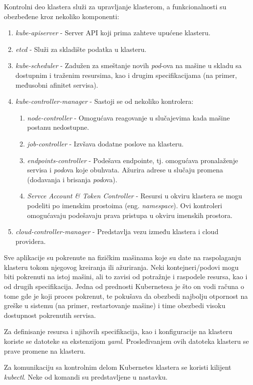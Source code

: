 \documentclass[12pt,oneside]{memoir}
\begin{document}
Kontrolni deo klastera služi za upravljanje klasterom, a funkcionalnosti su obezbeđene kroz nekoliko komponenti:
\begin{enumerate}
\item \emph{kube-apiserver} - Server API koji prima zahteve upućene klasteru.
\item \emph{etcd} - Služi za skladište podatka u klasteru.
\item \emph{kube-scheduler} - Zadužen za smeštanje novih \emph{pod}-ova na mašine u skladu sa dostupnim i traženim resursima, kao i drugim specifikacijama (na primer, međusobni afinitet servisa).
\item \emph{kube-controller-manager} - Sastoji se od nekoliko kontrolera:
	\begin{enumerate}
	\item \emph{node-controller} - Omogućava reagovanje u slučajevima kada mašine postanu nedostupne.
	\item \emph{job-controller} - Izvšava dodatne poslove na klasteru.
	\item \emph{endpoints-controller} - Podešava endpointe, tj. omogućava pronalaženje servisa i \emph{pod}ova koje obuhvata. Ažurira adrese u slučaju promena (dodavanja i brisanja \emph{pod}ova).
	\item \emph{Servce Account \& Token Controller} - Resursi u okviru klastera se mogu podeliti po imenskim prostoima (eng. \emph{namespace}). Ovi kontroleri omogućavaju podešavaju prava pristupa u okviru imenskih prostora.
	\end{enumerate}
\item \emph{cloud-controller-manager} - Predstavlja vezu između klastera i cloud providera.
\end{enumerate}
Sve aplikacije su pokrenute na fizičkim mašinama koje su date na raspolaganju klasteru tokom njegovog kreiranja ili ažuriranja. Neki kontejneri/podovi mogu biti pokrenuti na istoj mašini, ali to zavisi od potražnje i raspodele resursa, kao i od drugih specifikacija. Jedna od prednosti Kubernetesa je što on vodi računa o tome gde je koji proces pokrenut, te pokušava da obezbedi najbolju otpornost na greške u sistemu (na primer, restartovanje mašine) i time obezbedi visoku dostupnost pokrenutih servisa.

Za definisanje resursa i njihovih specifikacija, kao i konfiguracije na klasteru koriste se datoteke sa ekstenzijom \emph{yaml}. Prosleđivanjem ovih datoteka klasteru se prave promene na klasteru.

Za komunikaciju sa kontrolnim delom Kubernetes klastera se koristi kilijent \emph{kubectl}. Neke od komandi su predstavljene u nastavku.
\end{document}
